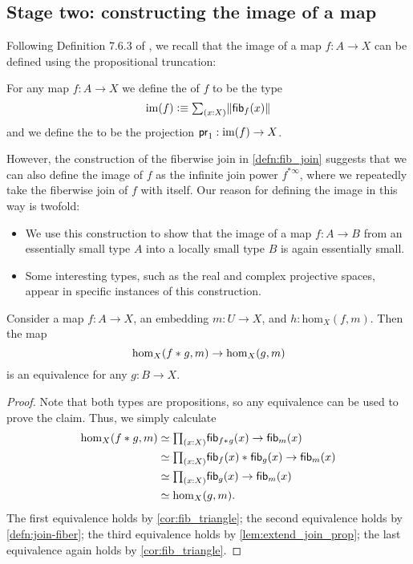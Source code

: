 \subsection{Stage two: constructing the image of a map}\label{sec:join_stage2}
Following Definition 7.6.3 of \cite{hottbook}, we recall that the image of a map $f:A\to X$ can be defined using the propositional truncation:
\begin{defn}
For any map $f:A\to X$ we define the  of $f$ to be the type
\begin{equation*}
\im(f) \defeq \sm{x:X}\brck{\fib{f}{x}}
\end{equation*}
and we define the  to be the projection $\mathsf{pr}_{1} :\operatorname{im}(f)\to X$. 
\end{defn}
However, the construction of the fiberwise join in \cref{defn:fib_join} suggests that we can also define the image of $f$ as the infinite join power $f^{\ast\infty}$, where we repeatedly take the fiberwise join of $f$ with itself. Our reason for defining the image in this way is twofold: 
\begin{itemize}
\item We use this construction to show that the image of a map $f:A\to B$ from an essentially small type $A$ into a locally small type $B$ is again essentially small.
\item Some interesting types, such as the real and complex projective spaces, appear in specific instances of this construction.
\end{itemize}

\begin{lem}
Consider a map $f:A\to X$, an embedding $m:U\to X$, and $h:\mathrm{hom}_X(f,m)$. Then the map
\begin{equation*}
\mathrm{hom}_X({f}\ast_{}{g},m)\to \mathrm{hom}_X(g,m)
\end{equation*}
is an equivalence for any $g:B\to X$.
\end{lem}

\begin{proof}
Note that both types are propositions, so any equivalence can be used to prove the claim. Thus, we simply calculate
\begin{align*}
\mathrm{hom}_X(\join{f}{g},m) & \eqvsym \prd{x:X}\fib{\join{f}{g}}{x}\to \fib{m}{x} \\
& \eqvsym \prd{x:X}\join{\fib{f}{x}}{\fib{g}{x}}\to\fib{m}{x} \\
& \eqvsym \prd{x:X}\fib{g}{x}\to\fib{m}{x} \\
& \eqvsym \mathrm{hom}_X(g,m).
\end{align*}
The first equivalence holds by \cref{cor:fib_triangle}; the second equivalence holds by \cref{defn:join-fiber}; the third equivalence holds by \cref{lem:extend_join_prop}; the last equivalence again holds by \cref{cor:fib_triangle}.
\end{proof}

